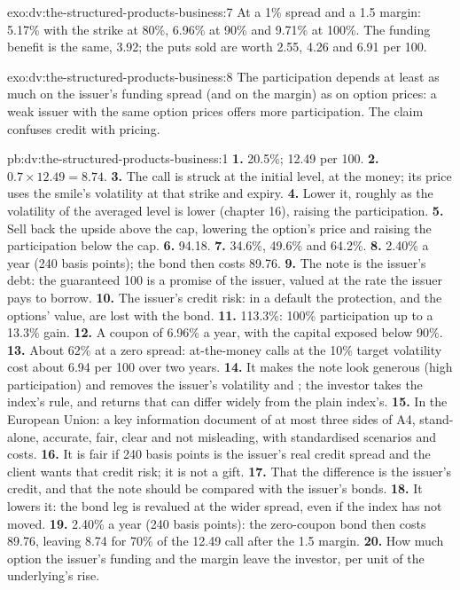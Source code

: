 \begin{solution}{exo:dv:the-structured-products-business:7}
At a 1\% spread and a 1.5 margin: 5.17\% with the strike at 80\%, 6.96\% at 90\% and 9.71\% at 100\%. The funding benefit is the same, 3.92;
the puts sold are worth 2.55, 4.26 and 6.91 per 100.
\end{solution}

\begin{solution}{exo:dv:the-structured-products-business:8}
The participation depends at least as much on the issuer's funding spread (and on the margin) as on option prices: a weak issuer with the
same option prices offers more participation. The claim confuses credit with pricing.
\end{solution}

\begin{solution}{pb:dv:the-structured-products-business:1}
\textbf{1.} 20.5\%; 12.49 per 100.
\textbf{2.} $0.7\times12.49=8.74$.
\textbf{3.} The call is struck at the initial level, at the money; its price uses the smile's volatility at that strike and expiry.
\textbf{4.} Lower it, roughly as the volatility of the averaged level is lower (chapter 16), raising the participation.
\textbf{5.} Sell back the upside above the cap, lowering the option's price and raising the participation below the cap.
\textbf{6.} 94.18.
\textbf{7.} 34.6\%, 49.6\% and 64.2\%.
\textbf{8.} 2.40\% a year (240 basis points); the bond then costs 89.76.
\textbf{9.} The note is the issuer's debt: the guaranteed 100 is a promise of the issuer, valued at the rate the issuer pays to borrow.
\textbf{10.} The issuer's credit risk: in a default the protection, and the options' value, are lost with the bond.
\textbf{11.} 113.3\%: 100\% participation up to a 13.3\% gain.
\textbf{12.} A coupon of 6.96\% a year, with the capital exposed below 90\%.
\textbf{13.} About 62\% at a zero spread: at-the-money calls at the 10\% target volatility cost about 6.94 per 100 over two years.
\textbf{14.} It makes the note look generous (high participation) and removes the issuer's volatility and ; the investor takes the
index's rule, and returns that can differ widely from the plain index's.
\textbf{15.} In the European Union: a key information document of at most three sides of A4, stand-alone, accurate, fair, clear and not
misleading, with standardised scenarios and costs.
\textbf{16.} It is fair if 240 basis points is the issuer's real credit spread and the client wants that credit risk; it is not a gift.
\textbf{17.} That the difference is the issuer's credit, and that the note should be compared with the issuer's bonds.
\textbf{18.} It lowers it: the bond leg is revalued at the wider spread, even if the index has not moved.
\textbf{19.} 2.40\% a year (240 basis points): the zero-coupon bond then costs 89.76, leaving 8.74 for 70\% of the 12.49 call after the 1.5 margin.
\textbf{20.} How much option the issuer's funding and the margin leave the investor, per unit of the underlying's rise.
\end{solution}

